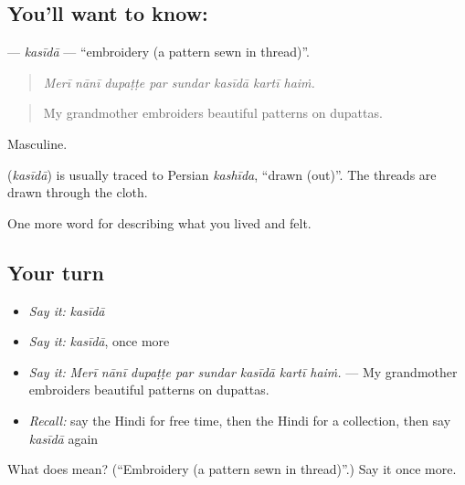 \subsection*{You'll want to know: }
\textbf{} — \emph{kasīdā} — \textquotedblleft{}embroidery (a pattern sewn in thread)\textquotedblright{}.

\begin{quote}
       
\end{quote}

\begin{quote}
\emph{Merī nānī dupaṭṭe par sundar kasīdā kartī haiṁ.}
\end{quote}

\begin{quote}
My grandmother embroiders beautiful patterns on dupattas.
\end{quote}

Masculine.

\begin{cousinweb}
\textbf{} (\emph{kasīdā}) is usually traced to Persian \emph{kashīda}, \textquotedblleft{}drawn (out)\textquotedblright{}. The threads are drawn through the cloth.
\end{cousinweb}

\begin{grammarlens}[title={What you've built}]
One more word for describing what you lived and felt.
\end{grammarlens}

\subsection*{Your turn}
\begin{itemize}
\raggedright
  \item \emph{Say it:} \emph{kasīdā}
  \item \emph{Say it:} \emph{kasīdā}, once more
  \item \emph{Say it:} \emph{Merī nānī dupaṭṭe par sundar kasīdā kartī haiṁ.} — My grandmother embroiders beautiful patterns on dupattas.
  \item \emph{Recall:} say the Hindi for free time, then the Hindi for a collection, then say \emph{kasīdā} again
\end{itemize}

\begin{tcolorbox}[breakable,colback=teal!4,colframe=teal!35!black,title={Before you move on}]
What does  mean? (\textquotedblleft{}Embroidery (a pattern sewn in thread)\textquotedblright{}.) Say it once more.
\end{tcolorbox}
